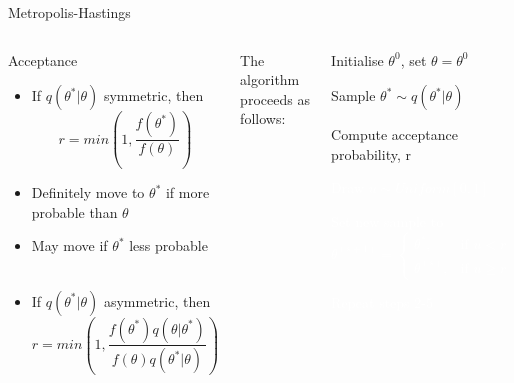 \documentclass[compress]{beamer}
\begin{document}
\begin{frame}[label=sec-7-9]{Metropolis-Hastings}
\begin{columns}[c] 
\begin{block}{Acceptance}
\begin{itemize}
\item If $q(\theta^*|\theta)$ symmetric, then 
$$ r = min \left( 1,\dfrac{f(\theta^*)}{f(\theta)} \right)$$ 
\item Definitely move to $\theta^*$ if more probable than $\theta$ 
\item May move if $\theta^*$ less probable \\~\\
\item If $q(\theta^*|\theta)$ asymmetric, then $$ r = min \left( 1,\dfrac{f(\theta^*)q(\theta|\theta^*)}{f(\theta)q(\theta^*|\theta)} \right)$$
\end{itemize}
\end{block}

The algorithm proceeds as follows:\\
\begin{enumerate}
\item Initialise $\theta^{0}$, set $\theta = \theta^{0}$
\item Sample $\theta^* \sim q(\theta^*|\theta)$
\item Compute acceptance probability, r
\textcolor{white}{
\item[\color{white}] Draw $u \sim Uniform[0,1]$
\item[\color{white}] Set new sample to 
\[
 \theta^{(s+1)} = 
\begin{cases}
    \theta^*, & \text{if } u < r\\
    \theta^{(s)}, & \text{if } u \geqslant r
\end{cases}
\]
\item[\color{white}] Repeat steps 2-5
}
\end{enumerate}
\end{columns}
\end{frame}
\end{document}
